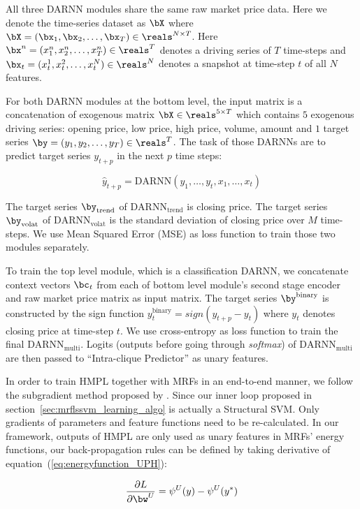\documentclass[sigconf]{acmart}
\renewcommand{\citename}{\citet}
\begin{document}
All three DARNN modules share the same raw market price data.
Here we denote the time-series dataset as $\bX$ where
$\bX=(\bx_1,\bx_2,\dots,\bx_T)\in \reals^{N\times T}$. Here
$\bx^n=(x_1^n,x_2^n,\dots,x_T^n) \in \reals^T$ denotes a driving
series of $T$ time-steps and $\bx_t=(x_t^1,x_t^2\\ ,\dots
,x_t^N)\in \reals^N$ denotes a snapshot at time-step $t$ of all
$N$ features.

For both DARNN modules at the bottom level, the input matrix is a
concatenation of exogenous matrix $\bX \in \reals^{5\times T}$
which contains $5$ exogenous driving series: opening price, low
price, high price, volume, amount and $1$ target series $\by =
(y_1,y_2,\dots,y_T) \in \reals^T$. The task of those DARNNs are
to predict target series $y_{t+p}$ in the next $p$ time steps:

$$\hat{y}_{t+p} = \text{DARNN}(y_1,\dots,y_{t},x_1,\dots,x_t)$$

The target series $\by_{\text{trend}}$ of
$\text{DARNN}_{\text{trend}}$ is closing price. The target series
$\by_{\text{volat}}$ of $\text{DARNN}_{\text{volat}}$ is the
standard deviation of closing price over $M$ time-steps. We use
Mean Squared Error (MSE) as loss function to train those two
modules separately.

To train the top level module, which is a classification DARNN,
we concatenate context vectors $\bc_t$ from each of bottom level
module's second stage encoder and raw market price matrix as
input matrix. The target series $\by^{\text{binary}}$ is
constructed by the sign function $y_t^{\text{binary}} =
sign(y_{t+p}-y_t)$ where $y_t$ denotes closing price at time-step
$t$. We use cross-entropy as loss function to train the final
$\text{DARNN}_{\text{multi}}$. Logits (outputs before going through
\emph{softmax}) of $\text{DARNN}_{\text{multi}}$ are then passed to 
``Intra-clique Predictor'' as unary features.

In order to train HMPL together with MRFs in an end-to-end manner,
we follow the subgradient method proposed by \citename{witoonchart2017application}.
Since our inner loop proposed in section~\ref{sec:mrflssvm_learning_algo}
is actually a Structural SVM. Only gradients of parameters and feature
functions need to be re-calculated. 
In our framework, outputs of HMPL are only used as unary features in MRFs'
energy functions, our back-propagation rules can be defined by
taking derivative of equation~(\ref{eq:energyfunction_UPH}):

\begin{align}
  \label{eq:der_w}
  \frac{\partial L}{\partial \bw^U} = \psi^U(y)-\psi^U(y^*)
\end{align}
\end{document}
